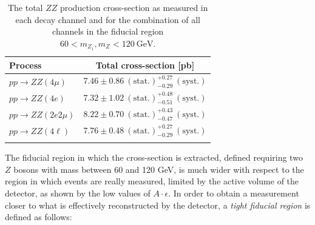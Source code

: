 \begin{table}[htbH]
\begin{center}
\caption{The total $ZZ$ production cross-section as measured in each decay channel and for the
combination of all channels in the fiducial region $60< m_{Z_{1}}, m_{Z_{}} < 120~\mathrm{GeV}$.}
\label{tab:xs}
\begin{tabular}{lc}
\hline Process & Total cross-section [pb]\\
\hline $pp\to ZZ(4\mu) $ & $7.46\pm 0.86~\mathrm{(stat.)}^{+0.27}_{- 0.29}~\mathrm{(syst.)}$\\
$pp\to ZZ(4e) $ &  $7.32\pm 1.02~\mathrm{(stat.)}^{+0.48}_{- 0.51}~\mathrm{(syst.)}$\\
$pp\to ZZ(2e2\mu)$ & $8.22\pm 0.70~\mathrm{(stat.)}^{+0.43}_{- 0.47}~\mathrm{(syst.)}$\\
\hline
\textbf{$pp\to ZZ(4\ell)$} & $7.76 \pm 0.48~\mathrm{(stat.)}^{+0.27}_{- 0.29}~\mathrm{(syst.)}$ \\
\hline \\
\end{tabular}%
\end{center}
\end{table}
The fiducial region in which the cross-section is extracted, defined requiring two $Z$ bosons with mass between 60 and 120 GeV, is much wider with respect to the region in which events are really measured, limited by the active volume of the detector, as shown by the low values of $A\cdot \epsilon$. In order to obtain a measurement closer to what is effectively reconstructed by the detector, a \emph{tight fiducial region} is defined as follows:
